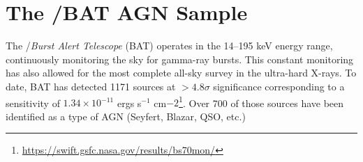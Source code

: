 \section{The \swift/BAT AGN Sample}\label{sample}
The  \swift/\textit{Burst Alert Telescope} (BAT) \citep{Barthelmy:2005ul,Gehrels:2004qf} operates in the 14--195 keV energy range, continuously monitoring the sky for gamma-ray bursts. This constant monitoring has also allowed for the most complete all-sky survey in the ultra-hard X-rays. To date, BAT has detected 1171 sources at  $>4.8\sigma$ significance corresponding to a sensitivity of $1.34\times10^{-11}$ ergs s$^{-1}$ cm${-2}$\footnote{\url{https://swift.gsfc.nasa.gov/results/bs70mon/}}. Over 700 of those sources have been identified as a type of AGN (Seyfert, Blazar, QSO, etc.)
